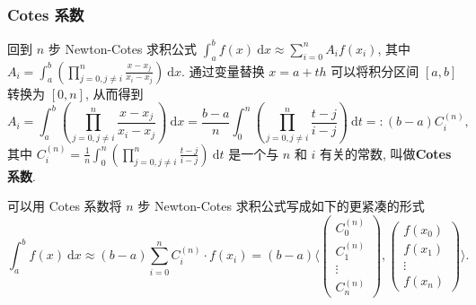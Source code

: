 \begin{frame}
\frametitle{Cotes 系数}

回到 $n$ 步 Newton-Cotes 求积公式 $\int_a^b f(x) ~ \mathrm{d}x \approx \sum_{i=0}^n A_i f(x_i)$, 其中 $A_i = \int_a^b \left( \prod_{j=0, j \neq i}^n \frac{x - x_j}{x_i - x_j} \right) ~ \mathrm{d}x$. 通过变量替换 $x = a + t h$ 可以将积分区间 $[a, b]$ 转换为 $[0, n]$, 从而得到
\[
A_i = \int_a^b \left( \prod_{j=0, j \neq i}^n \frac{x - x_j}{x_i - x_j} \right) ~ \mathrm{d}x = \frac{b-a}{n} \int_0^n \left(\prod_{j=0, j \neq i}^n \frac{t - j}{i - j} \right) ~ \mathrm{d}t =: (b-a) C_i^{(n)},
\]
其中 $C_i^{(n)} = \frac{1}{n} \int_0^n \left(\prod_{j=0, j \neq i}^n \frac{t - j}{i - j} \right) ~ \mathrm{d}t$ 是一个与 $n$ 和 $i$ 有关的常数, 叫做\textbf{Cotes 系数}.

\pause
\vspace{0.5em}

可以用 Cotes 系数将 $n$ 步 Newton-Cotes 求积公式写成如下的更紧凑的形式
\[
\int_a^b f(x) ~ \mathrm{d}x \approx (b-a) \sum_{i=0}^n C_i^{(n)} \cdot f(x_i) = (b-a) \langle \begin{pmatrix} C_0^{(n)} \\ C_1^{(n)} \\ \vdots \\ C_n^{(n)} \end{pmatrix}, \begin{pmatrix} f(x_0) \\ f(x_1) \\ \vdots \\ f(x_n) \end{pmatrix} \rangle.
\]

\end{frame}


